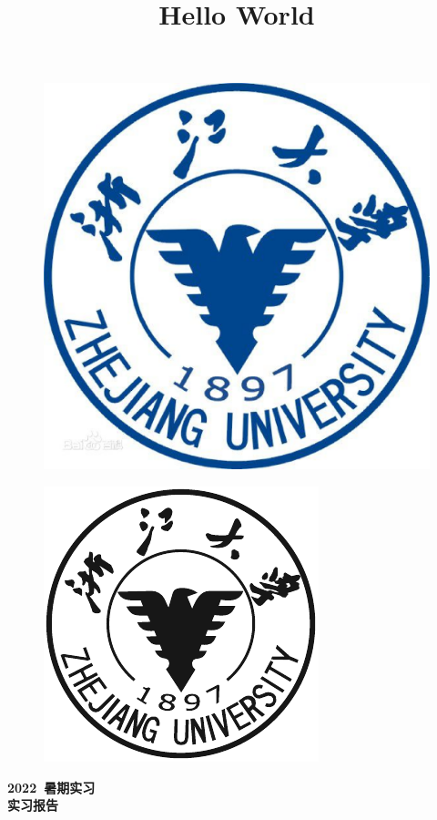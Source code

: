 \documentclass{ctexart}
\title{Hello World}
\begin{document}
\begin{titlepage}
        \vspace*{-2.5cm}
	
	\begin{figure}[h]
		\centering
		\includegraphics[width=0.7\linewidth]{zjdx}
	\end{figure}

	\begin{figure}[h]
		\centering
		\includegraphics[width=0.5\linewidth]{QSY}
	\end{figure}
	\vspace{-0.5cm}
	\begin{center}
		\Huge{\textbf{2022\ 暑期实习}}\\
		
		\Huge{\textbf{实习报告}}
	\end{center}
	
	
	\vspace*{1.5cm}


\end{titlepage}
\end{document}
